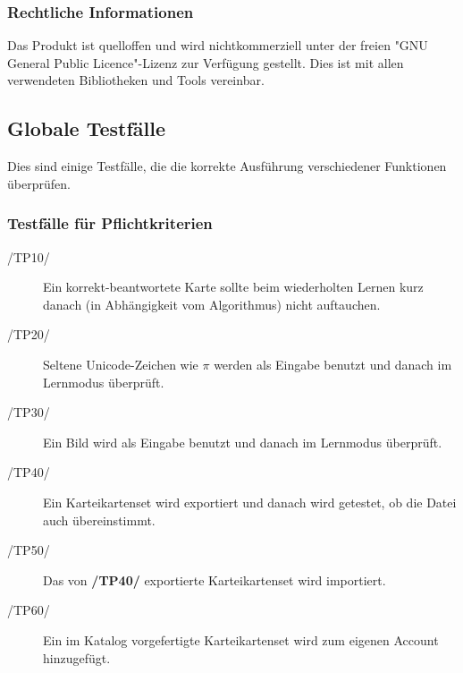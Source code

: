 
\subsubsection{Rechtliche Informationen}
Das Produkt ist quelloffen und wird nichtkommerziell unter der freien "GNU General Public Licence"-Lizenz zur Verfügung gestellt. Dies ist mit allen verwendeten Bibliotheken und Tools vereinbar.

\subsection{Globale Testfälle}
Dies sind einige Testfälle, die die korrekte Ausführung verschiedener Funktionen überprüfen.

\subsubsection{Testfälle für Pflichtkriterien}
\begin{description}
	\item[/TP10/] Ein korrekt-beantwortete Karte sollte beim wiederholten Lernen kurz danach (in Abhängigkeit vom Algorithmus) nicht auftauchen.
	\item[/TP20/] Seltene Unicode-Zeichen wie \(\pi\) werden als Eingabe benutzt und danach im Lernmodus überprüft.
	\item[/TP30/] Ein Bild wird als Eingabe benutzt und danach im Lernmodus überprüft.
	\item[/TP40/] Ein Karteikartenset wird exportiert und danach wird getestet, ob die Datei auch übereinstimmt.
	\item[/TP50/] Das von \textbf{/TP40/} exportierte Karteikartenset wird importiert.
	\item[/TP60/] Ein im Katalog vorgefertigte Karteikartenset wird zum eigenen Account hinzugefügt.
\end{description}

